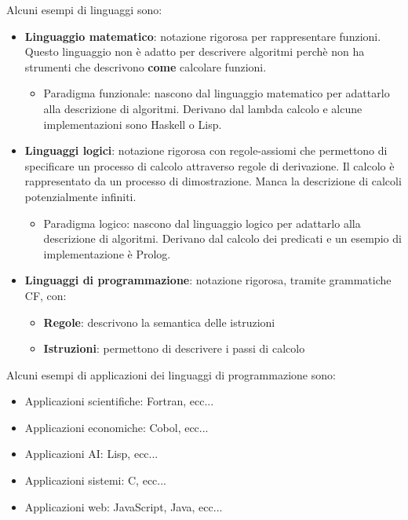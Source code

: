 \documentclass[a4paper]{article}
\begin{document}
\noindent
Alcuni esempi di linguaggi sono:
\begin{itemize}
  \item \textbf{Linguaggio matematico}: notazione rigorosa per rappresentare funzioni.
    Questo linguaggio non è adatto per descrivere algoritmi perchè non ha strumenti
    che descrivono \textbf{come} calcolare funzioni.

    \begin{itemize}
      \item Paradigma funzionale: nascono dal linguaggio matematico per adattarlo
        alla descrizione di algoritmi. Derivano dal lambda calcolo e alcune implementazioni
        sono Haskell o Lisp.
    \end{itemize}


  \item \textbf{Linguaggi logici}: notazione rigorosa con regole-assiomi che permettono
    di specificare un processo di calcolo attraverso regole di derivazione. Il
    calcolo è rappresentato da un processo di dimostrazione. Manca la descrizione
    di calcoli potenzialmente infiniti.

    \begin{itemize}
      \item Paradigma logico: nascono dal linguaggio logico per adattarlo alla descrizione di
        algoritmi. Derivano dal calcolo dei predicati e un esempio di implementazione è
        Prolog.
    \end{itemize}

  \item \textbf{Linguaggi di programmazione}: notazione rigorosa, tramite grammatiche CF,
    con:
    \begin{itemize}
      \item \textbf{Regole}: descrivono la semantica delle istruzioni
      \item \textbf{Istruzioni}: permettono di descrivere i passi di calcolo
    \end{itemize}
\end{itemize}

\begin{example}
  Alcuni esempi di applicazioni dei linguaggi di programmazione sono:
  \begin{itemize}
    \item Applicazioni scientifiche: Fortran, ecc...
    \item Applicazioni economiche: Cobol, ecc...
    \item Applicazioni AI: Lisp, ecc...
    \item Applicazioni sistemi: C, ecc...
    \item Applicazioni web: JavaScript, Java, ecc...
  \end{itemize}
\end{example}
\end{document}
